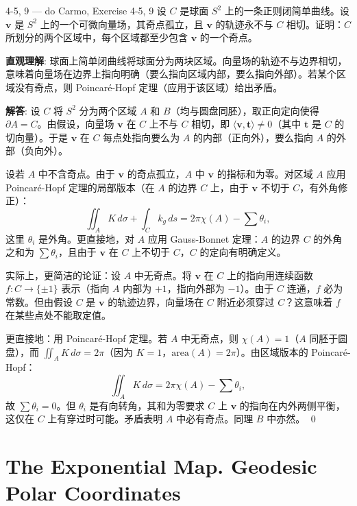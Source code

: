 \begin{exercise}{4-5, 9 — do Carmo, Exercise 4-5, 9}
设 $C$ 是球面 $S^2$ 上的一条正则闭简单曲线。设 $\mathbf{v}$ 是 $S^2$ 上的一个可微向量场，其奇点孤立，且 $\mathbf{v}$ 的轨迹永不与 $C$ 相切。证明：$C$ 所划分的两个区域中，每个区域都至少包含 $\mathbf{v}$ 的一个奇点。
\end{exercise}

\begin{solution}
\textbf{直观理解}: 球面上简单闭曲线将球面分为两块区域。向量场的轨迹不与边界相切，意味着向量场在边界上指向明确（要么指向区域内部，要么指向外部）。若某个区域没有奇点，则 Poincaré-Hopf 定理（应用于该区域）给出矛盾。

\textbf{解答}: 设 $C$ 将 $S^2$ 分为两个区域 $A$ 和 $B$（均与圆盘同胚），取正向定向使得 $\partial A = C$。由假设，向量场 $\mathbf{v}$ 在 $C$ 上不与 $C$ 相切，即 $\langle \mathbf{v}, \mathbf{t} \rangle \neq 0$（其中 $\mathbf{t}$ 是 $C$ 的切向量）。于是 $\mathbf{v}$ 在 $C$ 每点处指向要么为 $A$ 的内部（正向外），要么指向 $A$ 的外部（负向外）。

设若 $A$ 中不含奇点。由于 $\mathbf{v}$ 的奇点孤立，$A$ 中 $\mathbf{v}$ 的指标和为零。对区域 $A$ 应用 Poincaré-Hopf 定理的局部版本（在 $A$ 的边界 $C$ 上，由于 $\mathbf{v}$ 不切于 $C$，有外角修正）：
\[
\iint_A K\, d\sigma + \int_C k_g\, ds = 2\pi\chi(A) - \sum \theta_i,
\]
这里 $\theta_i$ 是外角。更直接地，对 $A$ 应用 Gauss-Bonnet 定理：$A$ 的边界 $C$ 的外角之和为 $\sum\theta_i$，且由于 $\mathbf{v}$ 在 $C$ 上不切于 $C$，$C$ 的定向有明确定义。

实际上，更简洁的论证：设 $A$ 中无奇点。将 $\mathbf{v}$ 在 $C$ 上的指向用连续函数 $f: C \to \{\pm 1\}$ 表示（指向 $A$ 内部为 $+1$，指向外部为 $-1$）。由于 $C$ 连通，$f$ 必为常数。但由假设 $C$ 是 $\mathbf{v}$ 的轨迹边界，向量场在 $C$ 附近必须穿过 $C$？这意味着 $f$ 在某些点处不能取定值。

更直接地：用 Poincaré-Hopf 定理。若 $A$ 中无奇点，则 $\chi(A)=1$（$A$ 同胚于圆盘），而 $\iint_A K\, d\sigma = 2\pi$（因为 $K=1$，$\mathrm{area}(A) = 2\pi$）。由区域版本的 Poincaré-Hopf：
\[
\iint_A K\, d\sigma = 2\pi\chi(A) - \sum \theta_i,
\]
故 $\sum \theta_i = 0$。但 $\theta_i$ 是有向转角，其和为零要求 $C$ 上 $\mathbf{v}$ 的指向在内外两侧平衡，这仅在 $C$ 上有穿过时可能。矛盾表明 $A$ 中必有奇点。同理 $B$ 中亦然。
\qed
\end{solution}

\section{The Exponential Map. Geodesic Polar Coordinates}\label{sec:exponential-map}

